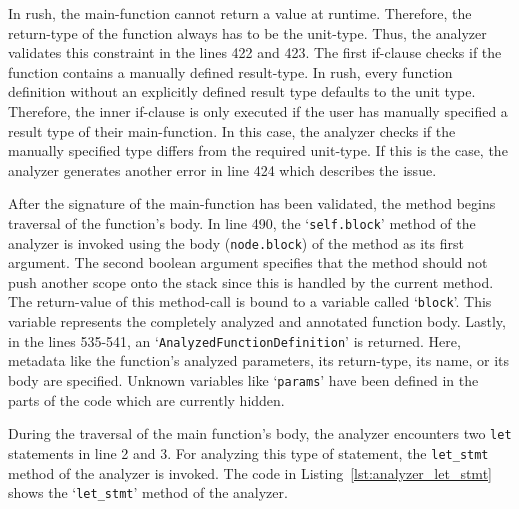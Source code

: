 In rush, the main-function cannot return a value at runtime.
Therefore, the return-type of the function always has to be the unit-type.
Thus, the analyzer validates this constraint in the lines 422 and 423.
The first if-clause checks if the function contains a manually defined result-type.
In rush, every function definition without an explicitly defined result type defaults to the unit type.
Therefore, the inner if-clause is only executed if the user has manually specified a result type of their main-function.
In this case, the analyzer checks if the manually specified type differs from the required unit-type.
If this is the case, the analyzer generates another error in line 424 which describes the issue.

After the signature of the main-function has been validated, the method begins traversal of the function's body.
In line 490, the `\texttt{self.block}' method of the analyzer is invoked using the body (\texttt{node.block}) of the method as its first argument.
The second boolean argument specifies that the method should not push another scope onto the stack since this is handled by the current method.
The return-value of this method-call is bound to a variable called `\texttt{block}'.
This variable represents the completely analyzed and annotated function body.
Lastly, in the lines 535-541, an `\texttt{AnalyzedFunctionDefinition}' is returned.
Here, metadata like the function's analyzed parameters, its return-type, its name, or its body are specified.
Unknown variables like `\texttt{params}' have been defined in the parts of the code which are currently hidden.

During the traversal of the main function's body, the analyzer encounters two \texttt{let} statements in line 2 and 3.
For analyzing this type of statement, the \texttt{let\_stmt} method of the analyzer is invoked.
The code in Listing~\ref{lst:analyzer_let_stmt} shows the `\texttt{let\_stmt}' method of the analyzer.


